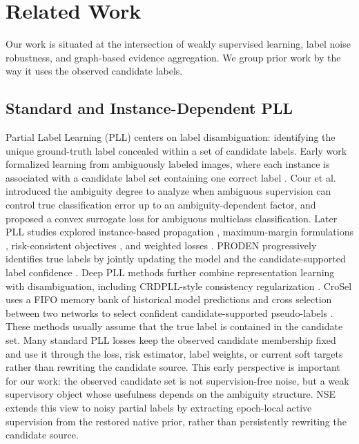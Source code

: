\section{Related Work} \label{sec:related_work}

Our work is situated at the intersection of weakly supervised learning, label
noise robustness, and graph-based evidence aggregation. We group prior work by
the way it uses the observed candidate labels.

\subsection{Standard and Instance-Dependent PLL}
Partial Label Learning (PLL) centers on label disambiguation: identifying the
unique ground-truth label concealed within a set of candidate labels. Early
work formalized learning from ambiguously labeled images, where each instance is
associated with a candidate label set containing one correct label
\cite{cour2009learning}. Cour et al. introduced the ambiguity degree to analyze
when ambiguous supervision can control true classification error up to an
ambiguity-dependent factor, and proposed a convex surrogate loss for ambiguous
multiclass classification. Later PLL studies explored instance-based
propagation \cite{zhang2015solving}, maximum-margin formulations
\cite{yu2016maximum}, risk-consistent objectives \cite{feng2020provably}, and
weighted losses \cite{wen2021leveraged}. PRODEN progressively identifies true
labels by jointly updating the model and the candidate-supported label
confidence \cite{lv2020progressive}. Deep PLL methods further combine
representation learning with disambiguation, including CRDPLL-style consistency
regularization \cite{wu2022revisiting}. CroSel uses a FIFO memory bank of
historical model predictions and cross selection between two networks to select
confident candidate-supported pseudo-labels \cite{tian2024crosel}. These
methods usually assume that the
true label is contained in the candidate set. Many standard PLL losses keep the
observed candidate membership fixed and use it through the loss, risk
estimator, label weights, or current soft targets rather than rewriting the
candidate source. This early perspective is important for our work: the
observed candidate set is not supervision-free noise, but a weak supervisory
object whose usefulness depends on the ambiguity structure. NSE extends this
view to noisy partial labels by extracting epoch-local active supervision from
the restored native prior, rather than persistently rewriting the candidate
source.

